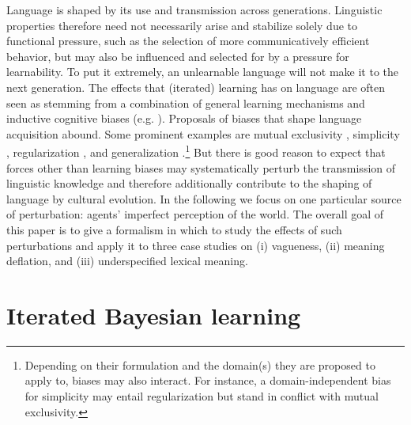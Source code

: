 \documentclass[10pt,a4paper]{article}
\begin{document}
Language is shaped by its use and transmission across generations. Linguistic properties
therefore need not necessarily arise and stabilize solely due to functional pressure, such as
the selection of more communicatively efficient behavior, but may also be influenced
and selected for by a pressure for learnability. To put it extremely, an unlearnable language
will not make it to the next generation. The effects that (iterated) learning has on language
are often seen as stemming from a combination of general learning mechanisms and inductive
cognitive biases
(e.g. \citealt{griffiths+kalish:2007,kirby+etal:2014,tamariz+kirby:2016}). Proposals of biases
that shape language acquisition abound. Some prominent examples are mutual exclusivity
\citep{merriman+bowman:1989,clark:2009}, simplicity \citep{kirby+etal:2015}, regularization
\citep{hudson+etal:2005}, and generalization
\citep{smith:2011,oconnor:2015}.\footnote{Depending on their formulation and the domain(s) they
  are proposed to apply to, biases may also interact. For instance, a domain-independent bias
  for simplicity may entail regularization but stand in conflict with mutual exclusivity.} But
there is good reason to expect that forces other than learning biases may systematically
perturb the transmission of linguistic knowledge and therefore additionally contribute to the shaping
of language by cultural evolution.  In the following we focus on one particular source of perturbation:
agents' imperfect perception of the world. The overall goal of this paper is to give a formalism in which to study the effects of such
perturbations and apply it to three case studies on (i) vagueness, (ii) meaning deflation, and
(iii) underspecified lexical meaning.

\section{Iterated Bayesian learning}
\end{document}
